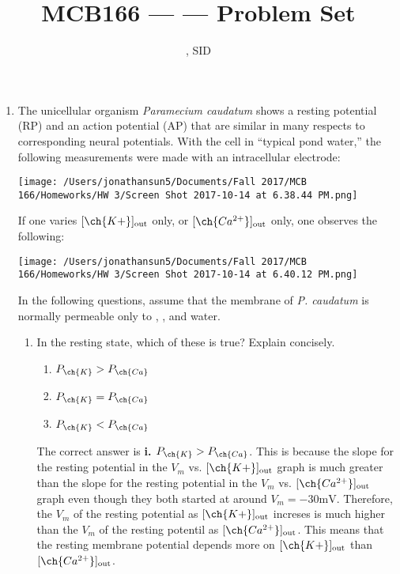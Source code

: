 \documentclass[11pt]{article}
\title{MCB166 --- \Session --- Problem Set \Homework}
\author{\Name, SID \SID}
\date{\displaydate{date}}
\begin{document}
\maketitle

\newpage
\begin{enumerate}[label=\arabic*.]
\item
The unicellular organism \textit{Paramecium caudatum} shows a resting potential (RP) and an action potential (AP) that are similar in many respects to corresponding neural potentials. With the cell in ``typical pond water,'' the following measurements were made with an intracellular electrode:
\begin{center}
\texttt{[image: /Users/jonathansun5/Documents/Fall 2017/MCB 166/Homeworks/HW 3/Screen Shot 2017-10-14 at 6.38.44 PM.png]}
\end{center}
If one varies $[\ch{K+}]_{\text{out}}$ only, or $[\ch{Ca^{2+}}]_{\text{out}}$ only, one observes the following:
\begin{center}
\texttt{[image: /Users/jonathansun5/Documents/Fall 2017/MCB 166/Homeworks/HW 3/Screen Shot 2017-10-14 at 6.40.12 PM.png]}
\end{center}
In the following questions, assume that the membrane of \textit{P. caudatum} is normally permeable only to , , and water.
\begin{enumerate}[label=(\alph*)]
\item
In the resting state, which of these is true? Explain concisely.
\begin{enumerate}[label=\roman*.]
\item
$P_{\ch{K}} > P_{\ch{Ca}}$
\item
$P_{\ch{K}} = P_{\ch{Ca}}$
\item
$P_{\ch{K}} < P_{\ch{Ca}}$
\end{enumerate}
\vspace*{1\baselineskip}
The correct answer is \textbf{i. $P_{\ch{K}} > P_{\ch{Ca}}$}. This is because the slope for the resting potential in the $V_m$ vs. $[\ch{K+}]_{\text{out}}$ graph is much greater than the slope for the resting potential in the $V_m$ vs. $[\ch{Ca^{2+}}]_{\text{out}}$ graph even though they both started at around $V_m = -30 \text{mV}$. Therefore, the $V_m$ of the resting potential as $[\ch{K+}]_{\text{out}}$ increses is much higher than the $V_m$ of the resting potentil as $[\ch{Ca^{2+}}]_{\text{out}}$. This means that the resting membrane potential depends more on $[\ch{K+}]_{\text{out}}$ than $[\ch{Ca^{2+}}]_{\text{out}}$.
\\




\end{enumerate}
\end{enumerate}
\end{document}
